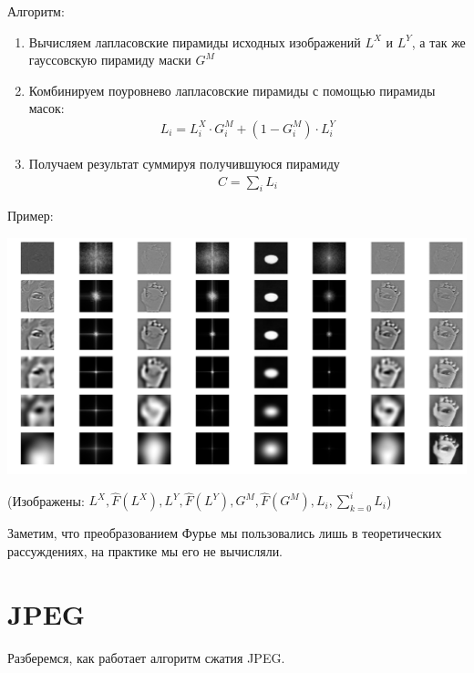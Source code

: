 \documentclass[]{book}
\theoremstyle{definition}
\begin{document}
Алгоритм:

\begin{enumerate}
    \item Вычисляем лапласовские пирамиды исходных изображений ${L}^X$ и ${L}^Y$, а так же гауссовскую пирамиду маски ${G}^M$
    \item Комбинируем поуровнево лапласовские пирамиды с помощью пирамиды масок:
    \begin{gather*}
        L_i = L^X_i \cdot G^M_i + (1 - G^M_i) \cdot L^Y_i
    \end{gather*}
    \item Получаем результат суммируя получившуюся пирамиду 
    \begin{gather*}
        C = \sum\limits_i L_i
    \end{gather*}
\end{enumerate}

Пример:

\begin{center}
    \includegraphics[scale=0.4]{images/example.png}
    
    (Изображены: $L^X, \hat{F}(L^X), L^Y, \hat{F}(L^Y), G^M, \hat{F}(G^M), L_i, \sum\limits_{k = 0}^i L_i$)
\end{center}

Заметим, что преобразованием Фурье мы пользовались лишь в теоретических рассуждениях, на практике мы его не вычисляли.

\section*{JPEG}

Разберемся, как работает алгоритм сжатия JPEG. 
\end{document}
